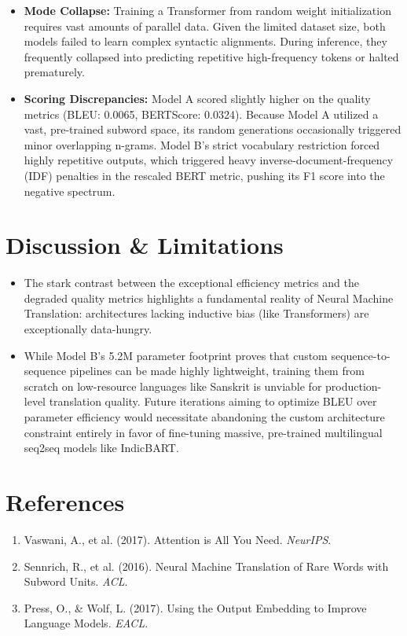 \documentclass[11pt]{article}
\begin{document}
\begin{itemize}[leftmargin=*]
    \item \textbf{Mode Collapse:} Training a Transformer from random weight initialization requires vast amounts of parallel data. Given the limited dataset size, both models failed to learn complex syntactic alignments. During inference, they frequently collapsed into predicting repetitive high-frequency tokens or halted prematurely.
    \item \textbf{Scoring Discrepancies:} Model A scored slightly higher on the quality metrics (BLEU: 0.0065, BERTScore: 0.0324). Because Model A utilized a vast, pre-trained subword space, its random generations occasionally triggered minor overlapping n-grams. Model B's strict vocabulary restriction forced highly repetitive outputs, which triggered heavy inverse-document-frequency (IDF) penalties in the rescaled BERT metric, pushing its F1 score into the negative spectrum.
\end{itemize}

\section{Discussion \& Limitations}

\begin{itemize}[leftmargin=*]
    \item The stark contrast between the exceptional efficiency metrics and the degraded quality metrics highlights a fundamental reality of Neural Machine Translation: architectures lacking inductive bias (like Transformers) are exceptionally data-hungry.
    
    \item While Model B's 5.2M parameter footprint proves that custom sequence-to-sequence pipelines can be made highly lightweight, training them from scratch on low-resource languages like Sanskrit is unviable for production-level translation quality. Future iterations aiming to optimize BLEU over parameter efficiency would necessitate abandoning the custom architecture constraint entirely in favor of fine-tuning massive, pre-trained multilingual seq2seq models like IndicBART.
\end{itemize}

\section{References}
\begin{enumerate}
    \item Vaswani, A., et al. (2017). Attention is All You Need. \textit{NeurIPS}.
    \item Sennrich, R., et al. (2016). Neural Machine Translation of Rare Words with Subword Units. \textit{ACL}.
    \item Press, O., \& Wolf, L. (2017). Using the Output Embedding to Improve Language Models. \textit{EACL}.
\end{enumerate}
\end{document}
